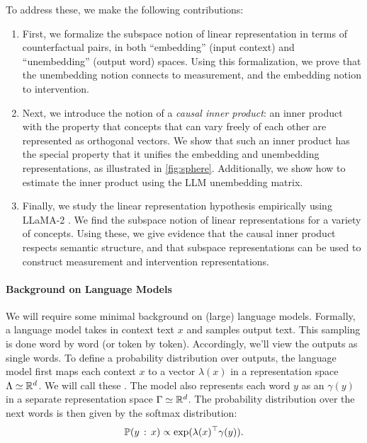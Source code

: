 \documentclass{article}
\theoremstyle{plain}
\theoremstyle{definition}
\theoremstyle{remark}
\begin{document}
To address these, we make the following contributions:
\begin{enumerate}[topsep=0pt, parsep=0pt, partopsep=0pt]
    \item First, we formalize the subspace notion of linear representation in terms of counterfactual pairs, in both ``embedding'' (input context) and ``unembedding'' (output word) spaces. Using this formalization, we prove that the unembedding notion connects to measurement, and the embedding notion to intervention.
    \item Next, we introduce the notion of a \emph{causal inner product}: an inner product with the property that concepts that can vary freely of each other are represented as orthogonal vectors. 
    We show that such an inner product has the special property that it unifies the embedding and unembedding representations, as illustrated in \cref{fig:sphere}.
    Additionally, we show how to estimate the inner product using the LLM unembedding matrix.
    \item Finally, we study the linear representation hypothesis empirically using LLaMA-2 \citep{touvron2023llama2}.
    We find the subspace notion of linear representations for a variety of concepts.
    Using these, we give evidence that the causal inner product respects semantic structure, and that subspace representations can be used to construct measurement and intervention representations.
\end{enumerate}

\paragraph{Background on Language Models}
We will require some minimal background on (large) language models.
Formally, a language model takes in context text $x$ and samples output text.
This sampling is done word by word (or token by token).
Accordingly, we'll view the outputs as single words.
To define a probability distribution over outputs, the language model first maps each context $x$ to a vector $\lambda(x)$ in a representation space $\Lambda \simeq \mathbb{R}^d$. We will call these .
The model also represents each word $y$ as an  $\gamma(y)$ in a separate representation space $\Gamma \simeq \mathbb{R}^d$.
The probability distribution over the next words is then given by the softmax distribution:
\begin{equation*}
    \Pr(y \given x) \propto \exp(\lambda(x)^\top \gamma(y)).
\end{equation*}
\end{document}
